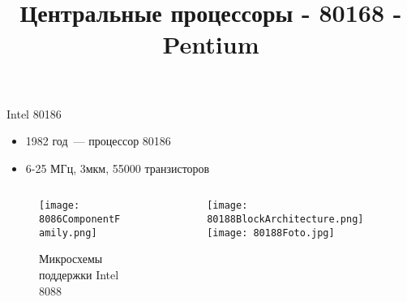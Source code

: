 \documentclass[aspectratio=169,14pt]{beamer}
\title{Центральные процессоры - 80168 - Pentium}
\begin{document}
\begin{frame}{Intel 80186}
    \begin{itemize}
        \item 1982 год~--- процессор 80186
        \pause
        \item 6-25 МГц, 3мкм, 55000 транзисторов
        \pause
    \end{itemize}
    \begin{columns}[T,onlytextwidth]
        \begin{column}{0.5\textwidth}
            \begin{figure}[htp]
                \centering
                \texttt{[image: 8086ComponentFamily.png]}
                \captionsetup{skip=-5pt}
                \caption{\tiny{Микросхемы поддержки Intel 8088}}
            \end{figure}
        \end{column}
        \begin{column}{0.5\textwidth}
            \begin{figure}[htp]
                \centering
                \texttt{[image: 80188BlockArchitecture.png]}
                \texttt{[image: 80188Foto.jpg]}
            \end{figure}
        \end{column}
    \end{columns}
\end{frame}
\end{document}
